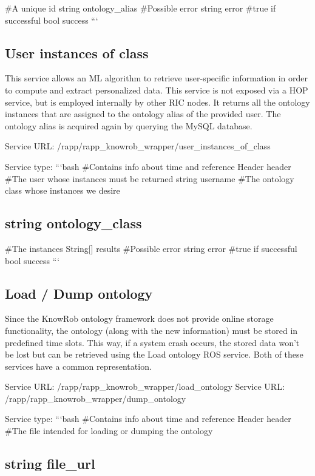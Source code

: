 \#\-A unique id string ontology\-\_\-alias \#\-Possible error string error \#true if successful bool success ```

\subsection*{User instances of class}

This service allows an M\-L algorithm to retrieve user-\/specific information in order to compute and extract personalized data. This service is not exposed via a H\-O\-P service, but is employed internally by other R\-I\-C nodes. It returns all the ontology instances that are assigned to the ontology alias of the provided user. The ontology alias is acquired again by querying the My\-S\-Q\-L database.

Service U\-R\-L\-: {\ttfamily /rapp/rapp\-\_\-knowrob\-\_\-wrapper/user\-\_\-instances\-\_\-of\-\_\-class}

Service type\-: ```bash \#\-Contains info about time and reference Header header \#\-The user whose instances must be returned string username \#\-The ontology class whose instances we desire \subsection*{string ontology\-\_\-class }

\#\-The instances String\mbox{[}\mbox{]} results \#\-Possible error string error \#true if successful bool success ```

\subsection*{Load / Dump ontology}

Since the Know\-Rob ontology framework does not provide online storage functionality, the ontology (along with the new information) must be stored in predefined time slots. This way, if a system crash occurs, the stored data won’t be lost but can be retrieved using the Load ontology R\-O\-S service. Both of these services have a common representation.

Service U\-R\-L\-: {\ttfamily /rapp/rapp\-\_\-knowrob\-\_\-wrapper/load\-\_\-ontology} Service U\-R\-L\-: {\ttfamily /rapp/rapp\-\_\-knowrob\-\_\-wrapper/dump\-\_\-ontology}

Service type\-: ```bash \#\-Contains info about time and reference Header header \#\-The file intended for loading or dumping the ontology \subsection*{string file\-\_\-url }

